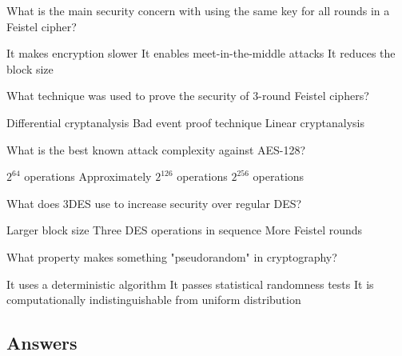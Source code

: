 \documentclass[10pt,a4paper,american]{exam}
\begin{document}
\begin{questions}
	\question What is the main security concern with using the same key for all rounds in a Feistel cipher?
	\begin{randomizechoices}
		\choice It makes encryption slower
		\CorrectChoice It enables meet-in-the-middle attacks
		\choice It reduces the block size
	\end{randomizechoices}

	\question What technique was used to prove the security of 3-round Feistel ciphers?
	\begin{randomizechoices}
		\choice Differential cryptanalysis
		\CorrectChoice Bad event proof technique
		\choice Linear cryptanalysis
	\end{randomizechoices}

	\question What is the best known attack complexity against AES-128?
	\begin{randomizechoices}
		\choice $2^{64}$ operations
		\CorrectChoice Approximately $2^{126}$ operations
		\choice $2^{256}$ operations
	\end{randomizechoices}

	\question What does 3DES use to increase security over regular DES?
	\begin{randomizechoices}
		\choice Larger block size
		\CorrectChoice Three DES operations in sequence
		\choice More Feistel rounds
	\end{randomizechoices}

	\question What property makes something "pseudorandom" in cryptography?
	\begin{randomizechoices}
		\choice It uses a deterministic algorithm
		\choice It passes statistical randomness tests
		\CorrectChoice It is computationally indistinguishable from uniform distribution
	\end{randomizechoices}

\end{questions}

\clearpage

\subsection*{Answers}
\printkeytable
\end{document}

